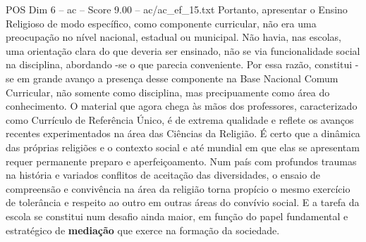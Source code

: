 \begin{textsample}{POS Dim 6 – ac – Score 9.00 – ac/ac\_ef\_15.txt}
Portanto, apresentar o Ensino Religioso de modo específico, como componente curricular, não era uma preocupação no nível nacional, estadual ou municipal.
Não havia, nas escolas, uma orientação clara do que deveria ser ensinado, não se via funcionalidade social na disciplina, abordando -se o que parecia conveniente.
Por essa razão, constitui -se em grande avanço a presença desse componente na Base Nacional Comum Curricular, não somente como disciplina, mas precipuamente como área do conhecimento.
O material que agora chega às mãos dos professores, caracterizado como Currículo de Referência Único, é de extrema qualidade e reflete os avanços recentes experimentados na área das Ciências da Religião.
É certo que a dinâmica das próprias religiões e o contexto social e até mundial em que elas se apresentam requer permanente preparo e aperfeiçoamento.
Num país com profundos traumas na história e variados conflitos de aceitação das diversidades, o ensaio de compreensão e convivência na área da religião torna propício o mesmo exercício de tolerância e respeito ao outro em outras áreas do convívio social.
E a tarefa da escola se constitui num desafio ainda maior, em função do papel fundamental e estratégico de \textbf{mediação} que exerce na formação da sociedade.

\end{textsample}
